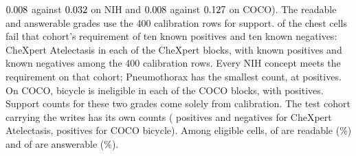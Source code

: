 \documentclass{article}
\begin{document}
$0.008$ against $0.032$ on NIH and $0.008$ against $0.127$ on COCO). The readable and answerable grades use the 400 calibration rows for support. \cfSupportInelChest{} of the \cfChestCellsN{} chest cells fail that cohort's requirement of ten known positives and ten known negatives: CheXpert Atelectasis in each of the \cfSupportInelChexBlocks{} CheXpert blocks, with \cfCalChexInelPos{} known positives and \cfCalChexInelNeg{} known negatives among the 400 calibration rows. Every NIH concept meets the requirement on that cohort; Pneumothorax has the smallest count, at \cfCalNihMinPos{} positives. On COCO, bicycle is ineligible in each of the \cfSupportInelCocoBlocks{} COCO blocks, with \cfCalCocoInelPos{} positives. Support counts for these two grades come solely from calibration. The test cohort carrying the writes has its own counts (\cfTestChexInelPos{} positives and \cfTestChexInelNeg{} negatives for CheXpert Atelectasis, \cfTestCocoInelPos{} positives for COCO bicycle). Among eligible cells, \cfSupportReadableChest{} of \cfSupportReadableNChest{} are readable (\cfSupportReadablePctChest\%) and \cfSupportAnswerableChest{} of \cfSupportAnswerableNChest{} are answerable (\cfSupportAnswerablePctChest\%).
\end{document}
